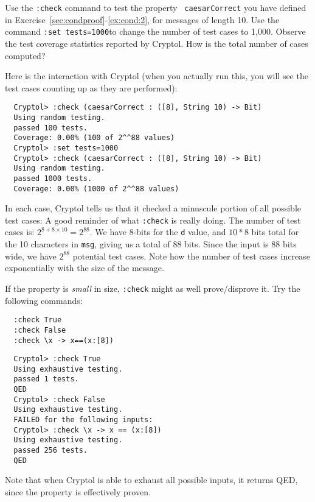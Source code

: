 \begin{Exercise}\label{ex:quick:0}
  Use the {\tt :check} command to test the property {\tt
    caesarCorrect} you have defined in
  Exercise~\ref{sec:condproof}-\ref{ex:cond:2}, for messages of length
  10.  Use the command {\tt :set tests=1000}\indQCCount to change the
  number of test cases to 1,000.  Observe the test coverage statistics
  reported by Cryptol. How is the total number of cases computed?
\end{Exercise}
\begin{Answer}
  Here is the interaction with Cryptol (when you actually run this,
  you will see the test cases counting up as they are
  performed):\indQCCount
\begin{Verbatim}
  Cryptol> :check (caesarCorrect : ([8], String 10) -> Bit)
  Using random testing.
  passed 100 tests.
  Coverage: 0.00% (100 of 2^^88 values)
  Cryptol> :set tests=1000
  Cryptol> :check (caesarCorrect : ([8], String 10) -> Bit)
  Using random testing.
  passed 1000 tests.
  Coverage: 0.00% (1000 of 2^^88 values)
\end{Verbatim}
In each case, Cryptol tells us that it checked a minuscule portion of
all possible test cases: A good reminder of what {\tt :check} is
really doing.  The number of test cases is: $2^{8+8\times10} =
2^{88}$. We have 8-bits for the {\tt d} value, and $10*8$ bits total
for the 10 characters in {\tt msg}, giving us a total of 88
bits. Since the input is 88 bits wide, we have $2^{88}$ potential test
cases. Note how the number of test cases increase exponentially with
the size of the message.
\end{Answer}

\begin{Exercise}\label{ex:quick:1}
  If the property is \emph{small} in size, {\tt :check} might as well
  prove/disprove it. Try the following commands:
\begin{Verbatim}
  :check True
  :check False
  :check \x -> x==(x:[8])
\end{Verbatim}
\end{Exercise}
\begin{Answer}
\begin{Verbatim}
  Cryptol> :check True
  Using exhaustive testing.
  passed 1 tests.
  QED
  Cryptol> :check False
  Using exhaustive testing.
  FAILED for the following inputs:
  Cryptol> :check \x -> x == (x:[8])
  Using exhaustive testing.
  passed 256 tests.
  QED
\end{Verbatim}
Note that when Cryptol is able to exhaust all possible inputs, it returns QED, since the property is effectively proven.
\end{Answer}

